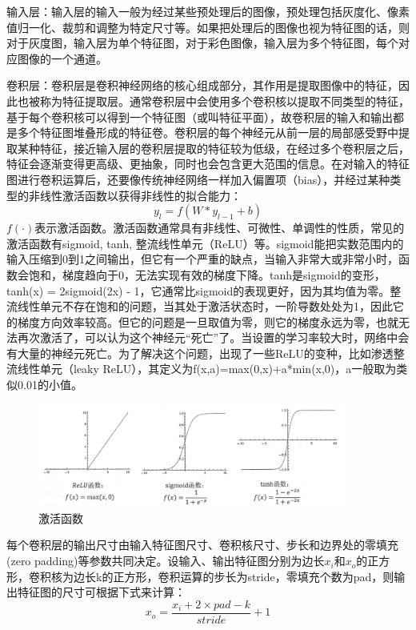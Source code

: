 输入层：输入层的输入一般为经过某些预处理后的图像，预处理包括灰度化、像素值归一化、裁剪和调整为特定尺寸等。如果把处理后的图像也视为特征图的话，则对于灰度图，输入层为单个特征图，对于彩色图像，输入层为多个特征图，每个对应图像的一个通道。

卷积层：卷积层是卷积神经网络的核心组成部分，其作用是提取图像中的特征，因此也被称为特征提取层。通常卷积层中会使用多个卷积核以提取不同类型的特征，基于每个卷积核可以得到一个特征图（或叫特征平面），故卷积层的输入和输出都是多个特征图堆叠形成的特征卷。卷积层的每个神经元从前一层的局部感受野中提取某种特征，接近输入层的卷积层提取的特征较为低级，在经过多个卷积层之后，特征会逐渐变得更高级、更抽象，同时也会包含更大范围的信息。在对输入的特征图进行卷积运算后，还要像传统神经网络一样加入偏置项（bias），并经过某种类型的非线性激活函数以获得非线性的拟合能力：
%
\begin{equation}
y_l = f(W*y_{l-1}+b)
\end{equation}
$f(\cdot)$表示激活函数。激活函数通常具有非线性、可微性、单调性的性质，常见的激活函数有sigmoid, tanh, 整流线性单元（ReLU）等。sigmoid能把实数范围内的输入压缩到0到1之间输出，但它有一个严重的缺点，当输入非常大或非常小时，函数会饱和，梯度趋向于0，无法实现有效的梯度下降。tanh是sigmoid的变形，tanh(x) = 2sigmoid(2x) - 1，它通常比sigmoid的表现更好，因为其均值为零。整流线性单元不存在饱和的问题，当其处于激活状态时，一阶导数处处为1，因此它的梯度方向效率较高。但它的问题是一旦取值为零，则它的梯度永远为零，也就无法再次激活了，可以认为这个神经元“死亡”了。当设置的学习率较大时，网络中会有大量的神经元死亡。为了解决这个问题，出现了一些ReLU的变种，比如渗透整流线性单元（leaky ReLU）\cite{maas2013rectifier}，其定义为f(x,a)=max(0,x)+a*min(x,0)，a一般取为类似0.01的小值。
\begin{figure}[htb] %
	\centering
	\includegraphics[width=4in]{figures/3_1_激活函数}
	\caption{激活函数} \label{fig:3_1_激活函数}
\end{figure}

每个卷积层的输出尺寸由输入特征图尺寸、卷积核尺寸、步长和边界处的零填充(zero padding)等参数共同决定。设输入、输出特征图分别为边长$x_{i}$和$x_{o}$的正方形，卷积核为边长k的正方形，卷积运算的步长为stride，零填充个数为pad，则输出特征图的尺寸可根据下式来计算：
%
\begin{equation}
x_o = \frac{x_i + 2 \times pad - k}{stride} + 1
\end{equation}


